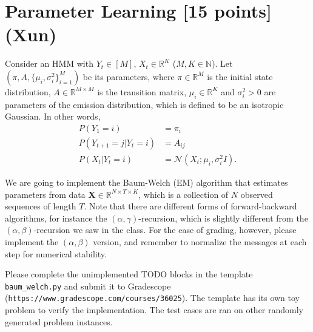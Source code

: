 \documentclass[12pt]{article} \usepackage[utf8]{inputenc}
\newcommand{\Ncal}{\mathcal{N}}
\begin{document}
\section{Parameter Learning [15 points] (Xun)}


\begin{figure}[h]
\centering
{}
\end{figure}

Consider an HMM with $ Y_t \in [M] $, $ X_t \in \mathbb{R}^{K} $ ($ M, K \in \mathbb{N} $).
Let $ (\pi, A, \{\mu_i, \sigma_i^2\}_{i=1}^M) $ be its parameters, where $ \pi \in \mathbb{R}^{M} $ is the initial state distribution, $ A \in \mathbb{R}^{M \times M} $ is the transition matrix, $ \mu_i \in \mathbb{R}^{K} $ and $ \sigma_i^2 > 0 $ are parameters of the emission distribution, which is defined to be an isotropic Gaussian. 
In other words,
\begin{align}
P(Y_1 = i) & = \pi_{i} \\
P(Y_{t+1} = j | Y_t = i) & = A_{ij} \\
P(X_t | Y_t = i) & = \Ncal(X_t; \mu_i, \sigma_i^2 I).
\end{align}


We are going to implement the Baum-Welch (EM) algorithm that estimates parameters from data $ \boldsymbol{X} \in \mathbb{R}^{N \times T \times K} $, which is a collection of $ N $ observed sequences of length $ T $. 
Note that there are different forms of forward-backward algorithms, for instance the $ (\alpha,\gamma) $-recursion, which is slightly different from the $ (\alpha,\beta)$-recursion we saw in the class. 
For the ease of grading, however, please implement the $ (\alpha,\beta) $ version, and remember to normalize the messages at each step for numerical stability.


Please complete the unimplemented TODO blocks in the template \verb|baum_welch.py| and submit it to Gradescope (\verb|https://www.gradescope.com/courses/36025|).
The template has its own toy problem to verify the implementation. 
The test cases are ran on other randomly generated problem instances.



\newpage


\end{document}
